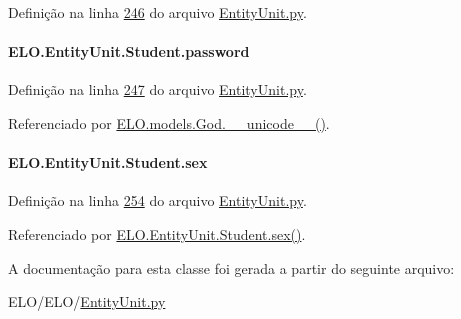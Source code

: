 Definição na linha \hyperlink{EntityUnit_8py_source_l00246}{246} do arquivo \hyperlink{EntityUnit_8py_source}{Entity\-Unit.\-py}.

\hypertarget{classELO_1_1EntityUnit_1_1Student_a834cad492221bfe3f26e590666e13f9a}{
\paragraph[{password}]{\setlength{\rightskip}{0pt plus 5cm}E\-L\-O.\-Entity\-Unit.\-Student.\-password}}\label{classELO_1_1EntityUnit_1_1Student_a834cad492221bfe3f26e590666e13f9a}


Definição na linha \hyperlink{EntityUnit_8py_source_l00247}{247} do arquivo \hyperlink{EntityUnit_8py_source}{Entity\-Unit.\-py}.



Referenciado por \hyperlink{classELO_1_1models_1_1God_aec7e462406b98293c953589a3a368825}{E\-L\-O.\-models.\-God.\-\_\-\-\_\-unicode\-\_\-\-\_\-()}.

\hypertarget{classELO_1_1EntityUnit_1_1Student_a5ca85c1d00044512e5dc3cfabac4ff9f}{
\paragraph[{sex}]{\setlength{\rightskip}{0pt plus 5cm}E\-L\-O.\-Entity\-Unit.\-Student.\-sex}}\label{classELO_1_1EntityUnit_1_1Student_a5ca85c1d00044512e5dc3cfabac4ff9f}


Definição na linha \hyperlink{EntityUnit_8py_source_l00254}{254} do arquivo \hyperlink{EntityUnit_8py_source}{Entity\-Unit.\-py}.



Referenciado por \hyperlink{classELO_1_1EntityUnit_1_1Student_a358998b764eed85c81244ee43792f762}{E\-L\-O.\-Entity\-Unit.\-Student.\-sex()}.



A documentação para esta classe foi gerada a partir do seguinte arquivo\-:\begin{DoxyCompactItemize}
\item 
E\-L\-O/\-E\-L\-O/\hyperlink{EntityUnit_8py}{Entity\-Unit.\-py}\end{DoxyCompactItemize}
